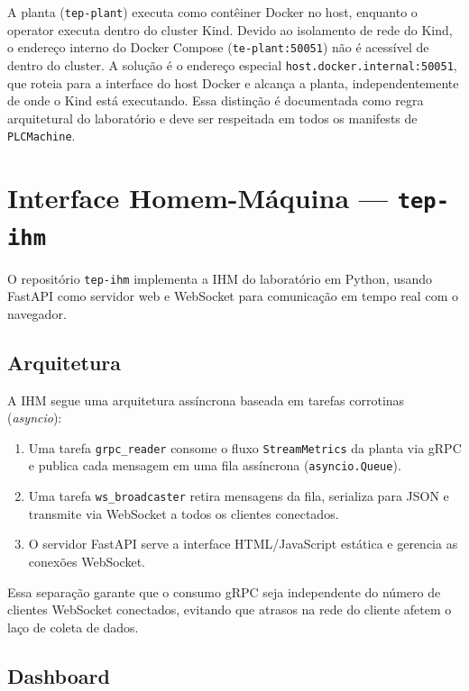 A planta (\texttt{tep-plant}) executa como contêiner Docker no host, enquanto o operator executa dentro do cluster Kind. Devido ao isolamento de rede do Kind, o endereço interno do Docker Compose (\texttt{te-plant:50051}) não é acessível de dentro do cluster. A solução é o endereço especial \texttt{host.docker.internal:50051}, que roteia para a interface do host Docker e alcança a planta, independentemente de onde o Kind está executando. Essa distinção é documentada como regra arquitetural do laboratório e deve ser respeitada em todos os manifests de \texttt{PLCMachine}.

\section{Interface Homem-Máquina — \texttt{tep-ihm}}
\label{sec:ihm}

O repositório \texttt{tep-ihm} implementa a IHM do laboratório em Python, usando FastAPI como servidor web e WebSocket para comunicação em tempo real com o navegador.

\subsection{Arquitetura}

A IHM segue uma arquitetura assíncrona baseada em tarefas corrotinas (\textit{asyncio}):

\begin{enumerate}
  \item Uma tarefa \texttt{grpc\_reader} consome o fluxo \texttt{StreamMetrics} da planta via gRPC e publica cada mensagem em uma fila assíncrona (\texttt{asyncio.Queue}).
  \item Uma tarefa \texttt{ws\_broadcaster} retira mensagens da fila, serializa para JSON e transmite via WebSocket a todos os clientes conectados.
  \item O servidor FastAPI serve a interface HTML/JavaScript estática e gerencia as conexões WebSocket.
\end{enumerate}

Essa separação garante que o consumo gRPC seja independente do número de clientes WebSocket conectados, evitando que atrasos na rede do cliente afetem o laço de coleta de dados.

\subsection{Dashboard}


